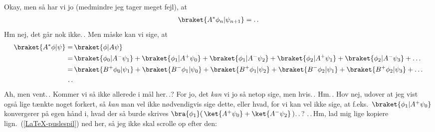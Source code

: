 \documentclass{report}
\begin{document}
Okay, men så har vi jo (medmindre jeg tager meget fejl), at
\begin{align}
\begin{aligned}
	\braket{A^* \phi_n | \psi_{n+1}} = .\,.
\end{aligned}
\end{align}
Hm nej, det går nok ikke.\,. Men måske kan vi sige, at 
\begin{align}
\begin{aligned}
	\braket{A^* \phi | \psi} =&\, \braket{\phi | A \psi} \\
		=&\,
			\braket{\phi_0 | A^- \psi_1} +
			\braket{\phi_1 | A^+ \psi_0} +
			\braket{\phi_1 | A^- \psi_2} +
			\braket{\phi_2 | A^+ \psi_1} +
			\braket{\phi_2 | A^- \psi_3} +
			\ldots\\
		=&\,
			\braket{B^+ \phi_0 | \psi_1} +
			\braket{B^- \phi_1 | \psi_0} +
			\braket{B^+ \phi_1 | \psi_2} +
			\braket{B^- \phi_2 | \psi_1} +
			\braket{B^+ \phi_2 | \psi_3} +
			\ldots\\
		.\,.&
\end{aligned}
\end{align}
Ah, men vent.\,. Kommer vi så ikke allerede i mål her.\,.? For jo, det \emph{kan} vi jo så netop sige, men hvis.\,. Hm.\,. Hov nej, udover at jeg vist også lige tænkte noget forkert, så \emph{kan} man vel ikke nødvendigvis sige dette, eller hvad, for vi kan vel ikke sige, at f.eks.\ $\braket{\phi_1 | A^+ \psi_0}$ konvergerer på egen hånd i, hvad der så burde skrives $\bra{\phi_1} (\,\ket{A^+ \psi_0} + \ket{A^- \psi_2}\,)$.\,.\,? .\,.\,Hm, lad mig lige kopiere lign.\ (\ref{LaTeX-puslespil}) ned her, så jeg ikke skal scrolle op efter den:
\end{document}
